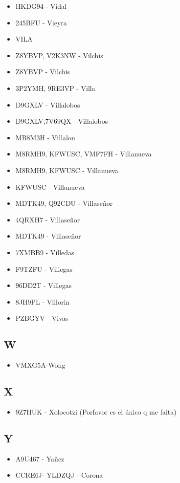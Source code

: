 \begin{itemize}[leftmargin=*,nosep]
\item HKDG94  -  Vidal
\item 245BFU  -  Vieyra
\item VILA
\item Z8YBVP, V2K3NW - Vilchis
\item Z8YBVP - Vilchis
\item 3P2YMH, 9RE3VP - Villa
\item D9GXLV  -  Villalobos
\item D9GXLV,7V69QX - Villalobos
\item MB8M3H - Villalon
\item M8RMH9, KFWUSC, VMF7FH - Villanueva
\item M8RMH9, KFWUSC - Villanueva
\item KFWUSC - Villanueva
\item MDTK49, Q92CDU - Villaseñor
\item 4QRXH7 - Villaseñor
\item MDTK49  -  Villaseñor
\item 7XMBB9 - Villedas
\item F9TZFU  -  Villegas
\item 96DD2T  -  Villegas
\item 8JH9PL - Villorin
\item PZBGYV - Vivas
\end{itemize}

\subsection*{W}
\begin{itemize}[leftmargin=*,nosep]
\item VMXG5A-Wong
\end{itemize}

\subsection*{X}
\begin{itemize}[leftmargin=*,nosep]
\item 9Z7HUK - Xolocotzi (Porfavor es el único q me falta)
\end{itemize}

\subsection*{Y}
\begin{itemize}[leftmargin=*,nosep]
\item A9U467 - Yañez
\item CCRE6J- YLDZQJ - Corona
\end{itemize}

